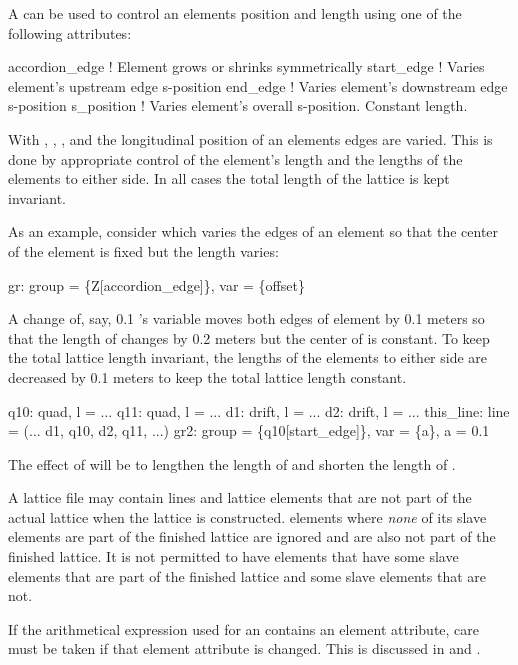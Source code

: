 A  can be used to control an elements position and length
using one of the following attributes:
\begin{example}
  accordion_edge  ! Element grows or shrinks symmetrically
  start_edge      ! Varies element's upstream edge s-position
  end_edge        ! Varies element's downstream edge s-position
  s_position      ! Varies element's overall s-position. Constant length.
\end{example}
With , , , and  the longitudinal
position of an elements edges are varied. This is done by appropriate control of the element's
length and the lengths of the elements to either side. In all cases the total length of the lattice
is kept invariant.

As an example, consider  which varies the edges of
an element so that the center of the element is fixed but the length
varies:
\begin{example}
  gr: group = \{Z[accordion_edge]\}, var = \{offset\}
\end{example}
A change of, say, 0.1 's  variable moves both edges
of element  by 0.1 meters so that the length of  changes
by 0.2 meters but the center of  is constant. To keep the total
lattice length invariant, the lengths of the elements to either side
are decreased by 0.1 meters to keep the total lattice length constant.
\begin{example}
  q10: quad, l = ...
  q11: quad, l = ...
  d1: drift, l = ...
  d2: drift, l = ...
  this_line: line = (... d1, q10, d2, q11, ...)
  gr2: group = \{q10[start_edge]\}, var = \{a\}, a = 0.1
\end{example}
The effect of   will be to lengthen the length of
 and shorten the length of .

A lattice file may contain lines and lattice elements that are not
part of the actual lattice when the lattice is constructed. 
elements where {\em none} of its slave elements are part of the
finished lattice are ignored and are also not part of the finished
lattice. It is not permitted to have  elements that have
some slave elements that are part of the finished lattice and some
slave elements that are not.

If the arithmetical expression used for an  contains an element attribute,
care must be taken if that element attribute is changed. This is discussed in
 and .

